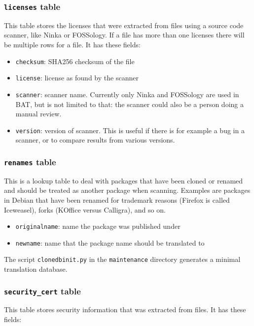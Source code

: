 \documentclass[10pt,a4paper]{article}
\begin{document}
\subsubsection{\texttt{licenses} table}

This table stores the licenses that were extracted from files using a source
code scanner, like Ninka or FOSSology. If a file has more than one licenses
there will be multiple rows for a file. It has these fields:

\begin{itemize}
\item \texttt{checksum}: SHA256 checksum of the file
\item \texttt{license}: license as found by the scanner
\item \texttt{scanner}: scanner name. Currently only Ninka and FOSSology are
used in BAT, but is not limited to that: the scanner could also be a person
doing a manual review.
\item \texttt{version}: version of scanner. This is useful if there is for
example a bug in a scanner, or to compare results from various versions.
\end{itemize}

\subsubsection{\texttt{renames} table}

This is a lookup table to deal with packages that have been cloned or renamed
and should be treated as another package when scanning. Examples are packages
in Debian that have been renamed for trademark reasons (Firefox is called
Iceweasel), forks (KOffice versus Calligra), and so on.

\begin{itemize}
\item \texttt{originalname}: name the package was published under
\item \texttt{newname}: name that the package name should be translated to
\end{itemize}

The script \texttt{clonedbinit.py} in the \texttt{maintenance} directory
generates a minimal translation database.

\subsubsection{\texttt{security\_cert} table}

This table stores security information that was extracted from files. It has
these fields:
\end{document}
